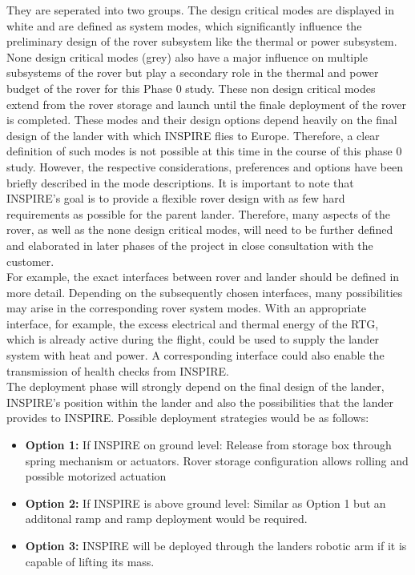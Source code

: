 They are seperated into two groups. The design critical modes are displayed in white and are defined as system modes, which significantly influence the preliminary design of the rover subsystem like the thermal or power subsystem. None design critical modes (grey) also have a major influence on multiple subsystems of the rover but play a secondary role in the thermal and power budget of the rover for this Phase 0 study. These non design critical modes extend from the rover storage and launch until the finale deployment of the rover is completed. These modes and their design options depend heavily on the final design of the lander with which INSPIRE flies to Europe. Therefore, a clear definition of such modes is not possible at this time in the course of this phase 0 study. However, the respective considerations, preferences and options have been briefly described in the mode descriptions. It is important to note that INSPIRE's goal is to provide a flexible rover design with as few hard requirements as possible for the parent lander. Therefore, many aspects of the rover, as well as the none design critical modes, will need to be further defined and elaborated in later phases of the project in close consultation with the customer. \\
For example, the exact interfaces between rover and lander should be defined in more detail. Depending on the subsequently chosen interfaces, many possibilities may arise in the corresponding rover system modes. With an appropriate interface, for example, the excess electrical and thermal energy of the RTG, which is already active during the flight, could be used to supply the lander system with heat and power. A corresponding interface could also enable the transmission of health checks from INSPIRE. \\
The deployment phase will strongly depend on the final design of the lander, INSPIRE's position within the lander and also the possibilities that the lander provides to INSPIRE.
Possible deployment strategies would be as follows:

\begin{itemize}
\itemsep0pt
\item	\textbf{Option 1:} If INSPIRE on ground level: Release from storage box through spring mechanism or actuators. Rover storage configuration allows rolling and possible motorized actuation
\item	\textbf{Option 2:} If INSPIRE is above ground level: Similar as Option 1 but an additonal ramp and ramp deployment would be required.
\item	\textbf{Option 3:} INSPIRE will be deployed through the landers robotic arm if it is capable of lifting its mass.
\end{itemize}


